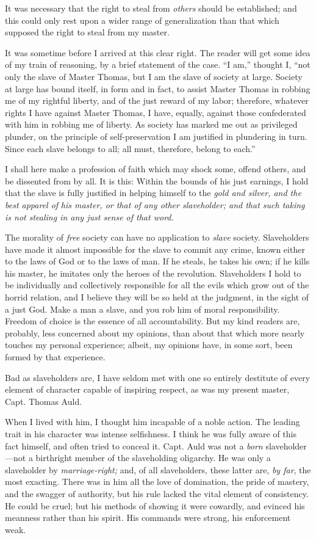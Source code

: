 It was necessary that the right to steal from \emph{others} should be
established; and this could only rest upon a wider range of
generalization than that which supposed the right to steal from my
master.

It was sometime before I arrived at this clear right. The reader will
get some idea of my train of reasoning, by a brief statement of the
case. ``I am,'' thought I, ``not only the slave of Master Thomas, but I
am the slave of society at large. Society at large has bound itself, in
form and in fact, to assist Master Thomas in robbing me of my rightful
liberty, and of the just reward of my labor; therefore, whatever rights
I have against Master Thomas, I have, equally, against those
confederated with him in robbing me of liberty. As society has marked me
out as privileged plunder, on the principle of self-preservation I am
justified in plundering in turn. Since each slave belongs to all; all
must, therefore, belong to each.''

I shall here make a profession of faith which may shock some, offend
others, and be dissented from by all. It is this: Within the bounds of
his just earnings, I hold that the slave is fully justified in helping
himself to the \emph{gold and silver, and the best apparel of}
{}\emph{his master, or that of any other slaveholder; and that such
taking is not stealing in any just sense of that word.}

The morality of \emph{free} society can have no application to
\emph{slave} society. Slaveholders have made it almost impossible for
the slave to commit any crime, known either to the laws of God or to the
laws of man. If he steals, he takes his own; if he kills his master, he
imitates only the heroes of the revolution. Slaveholders I hold to be
individually and collectively responsible for all the evils which grow
out of the horrid relation, and I believe they will be so held at the
judgment, in the sight of a just God. Make a man a slave, and you rob
him of moral responsibility. Freedom of choice is the essence of all
accountability. But my kind readers are, probably, less concerned about
my opinions, than about that which more nearly touches my personal
experience; albeit, my opinions have, in some sort, been formed by that
experience.

Bad as slaveholders are, I have seldom met with one so entirely
destitute of every element of character capable of inspiring respect, as
was my present master, Capt. Thomas Auld.

When I lived with him, I thought him incapable of a noble action. The
leading trait in his character was intense selfishness. I think he was
fully aware of this fact himself, and often tried to conceal it. Capt.
Auld was not a \emph{born} slaveholder---not a birthright member of the
slaveholding oligarchy. He was only a slaveholder by
\emph{marriage-right;} and, of all slaveholders, these latter are,
\emph{by far}, the most exacting. There was in him all the love of
domination, the pride of mastery, and the swagger of {}authority, but
his rule lacked the vital element of consistency. He could be cruel; but
his methods of showing it were cowardly, and evinced his meanness rather
than his spirit. His commands were strong, his enforcement weak.

